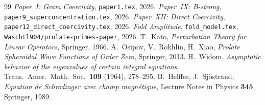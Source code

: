 \documentclass[12pt,a4paper]{amsart}
\theoremstyle{definition}
\theoremstyle{remark}
\begin{document}
\begin{thebibliography}{99}
 \textit{Paper~I: Gram Coercivity}, \texttt{paper1.tex}, 2026.
 \textit{Paper~IX: B-strong}, \texttt{paper9\_superconcentration.tex}, 2026.
 \textit{Paper~XII: Direct Coercivity}, \texttt{paper12\_direct\_coercivity.tex}, 2026.
 \textit{Fold Amplitude}, \texttt{fold\_model.tex},
  \texttt{Waschtl904/prolate-primes-paper}, 2026.
 T.~Kato, \textit{Perturbation Theory for Linear Operators},
  Springer, 1966.
 A.~Osipov, V.~Rokhlin, H.~Xiao,
  \textit{Prolate Spheroidal Wave Functions of Order Zero}, Springer, 2013.
 H.~Widom, \textit{Asymptotic behavior of the eigenvalues
  of certain integral equations},
  Trans.\ Amer.\ Math.\ Soc.\ \textbf{109} (1964), 278--295.
 B.~Helffer, J.~Sj\"ostrand, \textit{Equation de
  Schr\"odinger avec champ magn\'etique}, Lecture Notes in Physics
  \textbf{345}, Springer, 1989.
\end{thebibliography}
\end{document}
